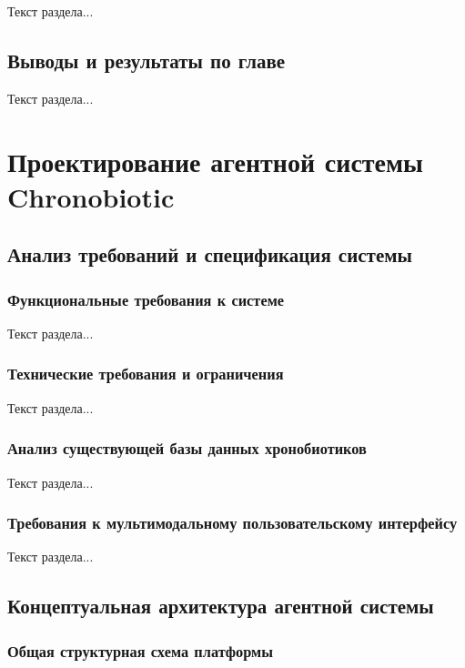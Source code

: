 Текст раздела...

\subsection{Выводы и результаты по главе}

Текст раздела...

\newpage

\section{Проектирование агентной системы Chronobiotic}

\subsection{Анализ требований и спецификация системы}

\subsubsection{Функциональные требования к системе}

Текст раздела...

\subsubsection{Технические требования и ограничения}

Текст раздела...

\subsubsection{Анализ существующей базы данных хронобиотиков}

Текст раздела...

\subsubsection{Требования к мультимодальному пользовательскому интерфейсу}

Текст раздела...

\subsection{Концептуальная архитектура агентной системы}

\subsubsection{Общая структурная схема платформы}

